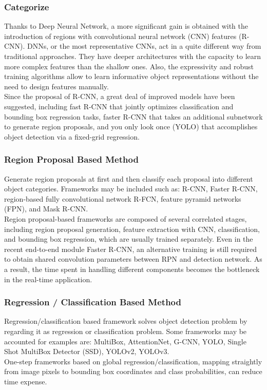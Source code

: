         \subsubsection{Categorize}
            Thanks to Deep Neural Network, a more significant gain is obtained with the introduction of regions with convolutional neural network (CNN) features (R-CNN). DNNs, or the most representative CNNs, act in a quite different way from traditional approaches. They have deeper architectures with the capacity to learn more complex features than the shallow ones. Also, the expressivity and robust training algorithms allow to learn informative object representations without the need to design features manually. \\
            \vspace{3mm}
            Since the proposal of R-CNN, a great deal of improved models have been suggested, including fast R-CNN that jointly optimizes classification and bounding box regression tasks, faster R-CNN that takes an additional subnetwork to generate region proposals, and you only look once (YOLO) that accomplishes object detection via a fixed-grid regression. \\

        \subsubsection{Region Proposal Based Method}
            Generate region proposals at first and then classify each proposal into different object categories. Frameworks may be included such as: R-CNN, Faster R-CNN, region-based fully convolutional network R-FCN, feature pyramid networks (FPN), and Mask R-CNN. \\
            \vspace{3mm}
            Region proposal-based frameworks are composed of several correlated stages, including region proposal generation, feature extraction with CNN, classification, and bounding box regression, which are usually trained separately. Even in the recent end-to-end module Faster R-CNN, an alternative training is still required to obtain shared convolution parameters between RPN and detection network. As a result, the time spent in handling different components becomes the bottleneck in the real-time application. \\

        \subsubsection{Regression / Classification Based Method}
            Regression/classification based framework solves object detection problem by regarding it as regression or classification problem. Some frameworks may be accounted for examples are: MultiBox, AttentionNet, G-CNN, YOLO, Single Shot MultiBox Detector (SSD), YOLOv2, YOLOv3. \\
            \vspace{3mm}
            One-step frameworks based on global regression/classification, mapping straightly from image pixels to bounding box coordinates and class probabilities, can reduce time expense. \\

